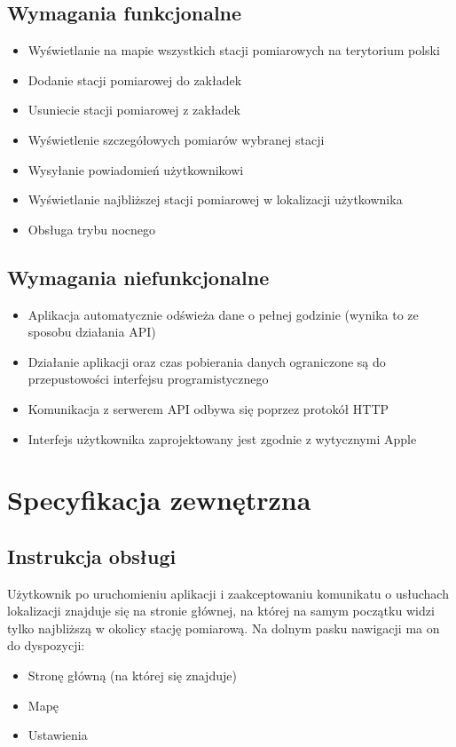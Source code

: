 \documentclass[a4paper,11pt,titlepage]{article}
\begin{document}
\subsection{Wymagania funkcjonalne}
\begin{itemize}
 	\item Wyświetlanie na mapie wszystkich stacji pomiarowych na terytorium polski
  	\item Dodanie stacji pomiarowej do zakładek
  	\item Usuniecie stacji pomiarowej z zakładek
	\item Wyświetlenie szczegółowych pomiarów wybranej stacji
	\item Wysyłanie powiadomień użytkownikowi
	\item Wyświetlanie najbliższej stacji pomiarowej w lokalizacji użytkownika
	\item Obsługa trybu nocnego
\end{itemize}
\subsection{Wymagania niefunkcjonalne}
\begin{itemize}
 	\item Aplikacja automatycznie odświeża dane o pełnej godzinie (wynika to ze sposobu działania API)
	\item Działanie aplikacji oraz czas pobierania danych ograniczone są do przepustowości interfejsu programistycznego
	\item Komunikacja z serwerem API odbywa się poprzez protokół HTTP
	\item Interfejs użytkownika zaprojektowany jest zgodnie z wytycznymi Apple
\end{itemize}

\section{Specyfikacja zewnętrzna}
\subsection{Instrukcja obsługi}
Użytkownik po uruchomieniu aplikacji i zaakceptowaniu komunikatu o usłuchach lokalizacji znajduje się na stronie głównej, na której na samym początku widzi tylko najbliższą w okolicy stację pomiarową. Na dolnym pasku nawigacji ma on do dyspozycji:
\begin{itemize}
 	\item Stronę główną (na której się znajduje)
	\item Mapę
	\item Ustawienia
\end{itemize}
\end{document}
